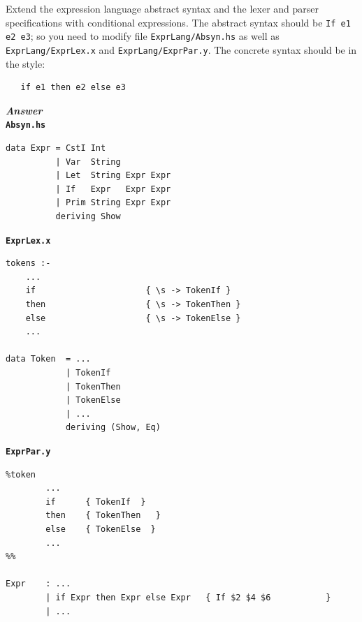 \documentclass[a4paper]{article}
\begin{document}
\begin{exercise}\label{exer-expr-conditional}
  Extend the expression language abstract syntax and the lexer and
  parser specifications with conditional expressions.  The abstract
  syntax should be \texttt{If e1 e2 e3}; so you need to modify file
  \texttt{ExprLang/Absyn.hs} as well as \texttt{ExprLang/ExprLex.x} and
  \texttt{ExprLang/ExprPar.y}.  The concrete syntax should be in the
  style:

{\codesetup\begin{verbatim}
   if e1 then e2 else e3
\end{verbatim}}

\noindent
\textbf{\emph{Answer}} \\

\noindent
\texttt{\textbf{Absyn.hs}}
{\codesetup\begin{verbatim}
data Expr = CstI Int 
          | Var  String 
          | Let  String Expr Expr
          | If   Expr   Expr Expr
          | Prim String Expr Expr
          deriving Show
\end{verbatim}} 

\noindent
\texttt{\textbf{ExprLex.x}}
{\codesetup\begin{verbatim}
tokens :-
    ...
    if                      { \s -> TokenIf }
    then                    { \s -> TokenThen }
    else                    { \s -> TokenElse }
    ...

data Token  = ... 
            | TokenIf
            | TokenThen
            | TokenElse
            | ...
            deriving (Show, Eq)

\end{verbatim}} 

\noindent
\texttt{\textbf{ExprPar.y}}
{\codesetup\begin{verbatim}
%token 
        ...
        if      { TokenIf  }
        then    { TokenThen   }
        else    { TokenElse  }
        ...
%%

Expr    : ...
        | if Expr then Expr else Expr   { If $2 $4 $6           }
        | ...
\end{verbatim}} 
\end{exercise}
\end{document}
